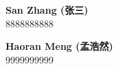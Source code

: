 
\centering

\Large \textbf{San Zhang (张\hspace{1em}三)}\\
\Large 8888888888

\Large \textbf{Haoran Meng (孟浩然)}\\
\Large 9999999999

